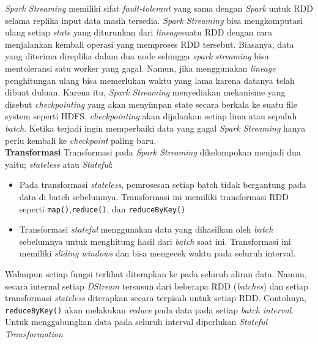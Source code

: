 \documentclass[a4paper,twoside]{article}
\begin{document}
\begin{enumerate}
		\textit{Spark Streaming} memiliki sifat \textit{fault-tolerant} yang sama dengan 						\textit{Spark} untuk RDD selama replika input data masih tersedia. \textit{Spark Streaming} 			bisa mengkomputasi ulang setiap \textit{state} yang diturunkan dari \textit{lineage}suatu 				RDD dengan cara menjalankan kembali operasi yang memproses RDD tersebut. Biasanya, data yang 		diterima direplika dalam dua node sehingga \textit{spark streaming} bisa mentoleransi satu 				worker yang gagal. Namun, jika menggunakan \textit{lineage} penghitungan ulang bisa 					memerlukan waktu yang lama karena datanya telah dibuat duluan. Karena itu, \textit{Spark 				Streaming} menyediakan mekanisme yang disebut \textit{checkpointing} yang akan menyimpan 				state secara berkala ke suatu file system seperti HDFS. \textit{checkpointing} akan 					dijalankan setiap lima atau sepuluh \textit{batch}. Ketika terjadi ingin memperbaiki data 				yang gagal \textit{Spark Streaming} hanya perlu kembali ke \textit{checkpoint} paling baru.
		\\
		\textbf{Transformasi}\newline
		Transformasi pada \textit{Spark Streaming} dikelompokan menjadi dua yaitu; 								\textit{stateless} atau \textit{Stateful}:
		\begin{itemize}
			\item{ Pada transformasi \textit{stateless}, pemrosesan setiap batch tidak bergantung 					pada data di batch sebelumnya. Transformasi ini memiliki transformasi RDD seperti 						\texttt{map()},\texttt{reduce()}, dan \texttt{reduceByKey()}	
			}
	
			\item{Transformasi \textit{stateful} menggunakan data yang dihasilkan oleh 								\textit{batch} sebelumnya untuk menghitung hasil dari \textit{batch} saat ini. 							Transformasi ini memiliki \textit{sliding windows} dan bisa mengecek waktu pada seluruh 				interval.
	
			}
		\end{itemize}
		
		Walaupun setiap fungsi terlihat diterapkan ke pada seluruh aliran data. Namun, secara 			 		internal setiap \textit{DStream} tersusun dari beberapa RDD (\textit{batches}) dan setiap 		 		transformasi \textit{stateless} diterapkan secara terpisah untuk setiap RDD. Contohnya, 
		 \texttt{reduceByKey()} akan melakukan \textit{reduce} pada data pada setiap \textit{batch 		 		interval}. Untuk menggabungkan data pada seluruh interval diperlukan \textit{Stateful 			 		Transformation} 
	

\end{enumerate}
\end{document}
